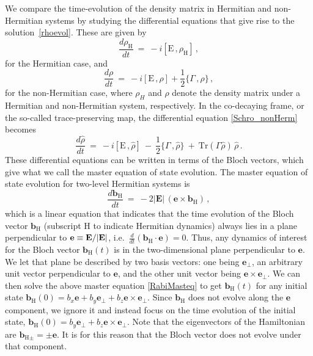 \documentclass[12pt,a4paper]{article}
\begin{document}
We compare the time-evolution of the density matrix in Hermitian and non-Hermitian systems by studying the differential equations that give rise to the solution~\eqref{rhoevol}. These are given by
\begin{equation}
    \dfrac{d\rho_{\text{H}}}{dt}\: =\: -i[\mathrm{E}\,,\rho_{\text{H}}]\label{Schro_Hermitian}\,,
\end{equation}
for the Hermitian case, and
\begin{equation}
    \dfrac{d\rho}{dt}\: =\: -i[\mathrm{E}\,,\rho] + \dfrac{1}{2}\{\Gamma\,,\rho\}\label{Schro_nonHerm}\,,
\end{equation}
for the non-Hermitian case, where $\rho_{H}$ and $\rho$ denote the density matrix under a Hermitian and non-Hermitian system, respectively. In the co-decaying frame, or the so-called trace-preserving map, the differential equation \eqref{Schro_nonHerm} becomes
\begin{equation}
    \dfrac{d\hat{\rho}}{dt}\: =\: -i[\mathrm{E}\,,\hat{\rho}]\: -\: \dfrac{1}{2}\{\Gamma\,,\hat{\rho}\}\: +\: \mathrm{Tr}(\Gamma\hat{\rho})\,\hat{\rho}\label{Schro_nonHerm_codec}\,.
\end{equation}
These differential equations can be written in terms of the Bloch vectors, which give what we call the master equation of state evolution\cite{Karamitros:2022oew}.
The master equation of state evolution for two-level Hermitian systems is
\begin{equation}
    \dfrac{d\mathbf{b}_{\text{H}}}{dt}\: =\: -2|\mathbf{E}|\,(\mathbf{e}\times \mathbf{b}_{\text{H}}\label{RabiMasteq})\,,
\end{equation}
which is a linear equation that indicates that the time evolution of the Bloch vector $\mathbf{b}_{\text{H}}$ (subscript H to indicate Hermitian dynamics) always lies in a plane perpendicular to $\mathbf{e}\equiv {\bf E}/|{\bf E}|$, i.e.~$\frac{d}{dt}(\mathbf{b}_{\text{H}}\cdot\mathbf{e})=0$. Thus, any dynamics of interest for the Bloch vector $\mathbf{b}_{\text{H}}(t)$ is in the two-dimensional plane perpendicular to $\mathbf{e}$. We let that plane be described by two basis vectors: one being $\mathbf{e}_{\perp}$, an arbitrary unit vector perpendicular to $\mathbf{e}$, and the other unit vector being $\mathbf{e}\times\mathbf{e}_{\perp}$. We can then solve the above master equation \eqref{RabiMasteq} to get $\mathbf{b}_{\text{H}}(t)$ for any initial state  $\mathbf{b}_{\text{H}}(0) = b_x\mathbf{e} + b_y\mathbf{e}_{\perp} +b_z\mathbf{e}\times\mathbf{e}_{\perp}$. Since $\mathbf{b}_{\text{H}}$ does not evolve along the $\mathbf{e}$ component, we ignore it and instead focus on the time evolution of the initial state, $\mathbf{b}_{\text{H}}(0)=b_y\mathbf{e}_{\perp} +b_z\mathbf{e}\times\mathbf{e}_{\perp}$. Note that the eigenvectors of the Hamiltonian are $\mathbf{b}_{\text{H}\pm} = \pm \mathbf{e}$. It is for this reason that the Bloch vector does not evolve under that component.
\end{document}
